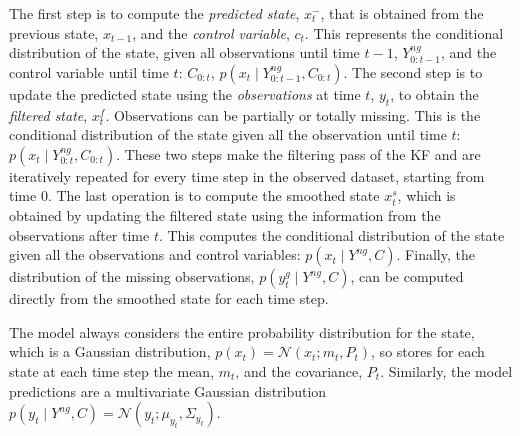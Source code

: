 \documentclass{article}
\newcommand{\norm}[3]{\mathcal{N}\left(#1; #2, #3\right)} %
\begin{document}
The first step is to compute the \textit{predicted state}, $x^-_t$, that is obtained from the previous state, $x_{t-1}$, and the \textit{control variable}, $c_t$. This represents the conditional distribution of the state, given all observations until time $t-1$, $Y^{ng}_{0:t-1}$, and the control variable until time $t$: $C_{0:t}$, $p(x_t \mid Y^{ng}_{0:t-1}, C_{0:t})$.
The second step is to update the predicted state using the \textit{observations} at time $t$, $y_t$, to obtain the \textit{filtered state}, $x^f_t$. Observations can be partially or totally missing. This is the conditional distribution of the state given all the observation until time $t$: $p(x_t \mid Y^{ng}_{0:t}, C_{0:t})$.
These two steps make the filtering pass of the KF and are iteratively repeated for every time step in the observed dataset, starting from time $0$.
The last operation is to compute the smoothed state $x^s_t$, which is obtained by updating the filtered state using the information from the observations after time $t$. This computes the conditional distribution of the state given all the observations and control variables: $p(x_t \mid Y^{ng}, C)$.
Finally, the distribution of the missing observations, $p(y^g_t \mid Y^{ng}, C)$, can be computed directly from the smoothed state for each time step.

The model always considers the entire probability distribution for the state, which is a Gaussian distribution,  $p(x_t) = \norm{x_t}{m_t}{P_t}$, so stores for each state at each time step the mean, $m_t$, and the covariance, $P_t$. Similarly, the model predictions are a multivariate Gaussian distribution $p(y_t \mid Y^{ng}, C) =  \norm{y_t}{\mu_{y_t}}{\Sigma_{y_t}}$.
\end{document}
